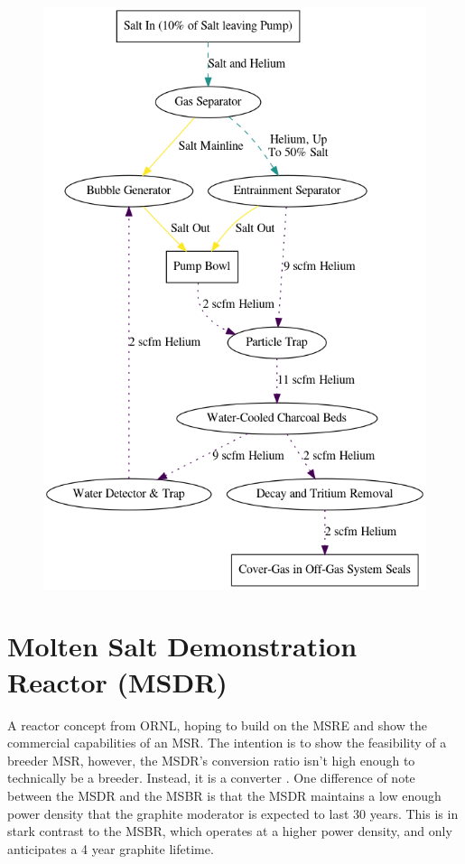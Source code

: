 \documentclass[letterpaper]{article}
\begin{document}
\begin{figure}[H]
  \centering
  \includegraphics[height=.5\textheight]{figures/msbr-offgas.png}
  \label{fig:figD}
\end{figure}

\section{Molten Salt Demonstration Reactor (MSDR)}
A reactor concept from ORNL, hoping to build on the MSRE and show the commercial capabilities of an MSR.  The intention is to show the feasibility of a breeder MSR, however, the MSDR's conversion ratio isn't high enough to technically be a breeder.  Instead, it is a converter \cite{bettis_design_1972}.  One difference of note between the MSDR and the MSBR is that the  MSDR maintains a low enough power density that the graphite moderator is expected to last 30 years.  This is in stark contrast to the MSBR, which operates at a higher power density, and only anticipates a 4 year graphite lifetime.
\end{document}
